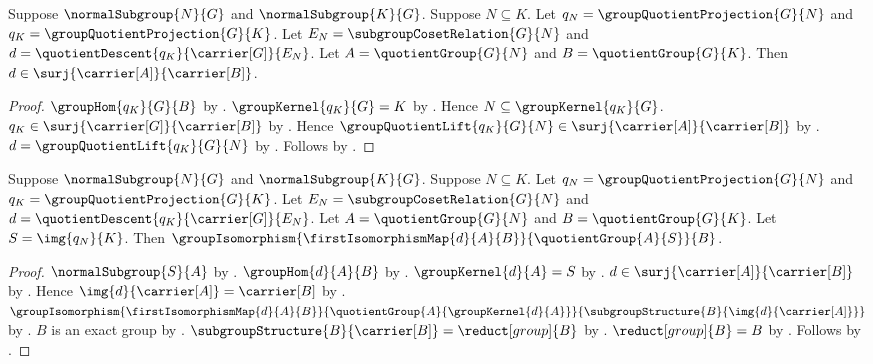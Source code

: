 \begin{theorem}\label{group_quotient_comparison_surjective}
    Suppose $\normalSubgroup{N}{G}$ and $\normalSubgroup{K}{G}$.
    Suppose $N\subseteq K$.
    Let $q_N=\groupQuotientProjection{G}{N}$ and
        $q_K=\groupQuotientProjection{G}{K}$.
    Let $E_N=\subgroupCosetRelation{G}{N}$ and
        $d=\quotientDescent{q_K}{\carrier[G]}{E_N}$.
    Let $A=\quotientGroup{G}{N}$ and $B=\quotientGroup{G}{K}$.
    Then $d\in\surj{\carrier[A]}{\carrier[B]}$.
\end{theorem}
\begin{proof}
    $\groupHom{q_K}{G}{B}$ by
        .
    $\groupKernel{q_K}{G}=K$ by
        .
    Hence $N\subseteq\groupKernel{q_K}{G}$.
    $q_K\in\surj{\carrier[G]}{\carrier[B]}$ by
        .
    Hence $\groupQuotientLift{q_K}{G}{N}\in
        \surj{\carrier[A]}{\carrier[B]}$ by
        .
    $d=\groupQuotientLift{q_K}{G}{N}$ by
        .
    Follows by \auto.
\end{proof}

\begin{theorem}\label{group_third_isomorphism_theorem}
    Suppose $\normalSubgroup{N}{G}$ and $\normalSubgroup{K}{G}$.
    Suppose $N\subseteq K$.
    Let $q_N=\groupQuotientProjection{G}{N}$ and
        $q_K=\groupQuotientProjection{G}{K}$.
    Let $E_N=\subgroupCosetRelation{G}{N}$ and
        $d=\quotientDescent{q_K}{\carrier[G]}{E_N}$.
    Let $A=\quotientGroup{G}{N}$ and $B=\quotientGroup{G}{K}$.
    Let $S=\img{q_N}{K}$.
    Then
        $\groupIsomorphism
            {\firstIsomorphismMap{d}{A}{B}}
            {\quotientGroup{A}{S}}{B}$.
\end{theorem}
\begin{proof}
    $\normalSubgroup{S}{A}$ by
        .
    $\groupHom{d}{A}{B}$ by
        .
    $\groupKernel{d}{A}=S$ by
        .
    $d\in\surj{\carrier[A]}{\carrier[B]}$ by
        .
    Hence $\img{d}{\carrier[A]}=\carrier[B]$ by
        .
    $\groupIsomorphism
        {\firstIsomorphismMap{d}{A}{B}}
        {\quotientGroup{A}{\groupKernel{d}{A}}}
        {\subgroupStructure{B}{\img{d}{\carrier[A]}}}$ by
        .
    $B$ is an exact group by
        .
    $\subgroupStructure{B}{\carrier[B]}=\reduct[group]{B}$ by
        .
    $\reduct[group]{B}=B$ by .
    Follows by \auto.
\end{proof}

